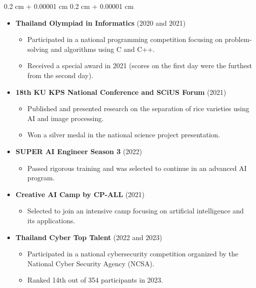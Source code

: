 \documentclass[8pt,letterpaper]{extarticle}
\newenvironment{highlights}{
    \begin{itemize}[
        topsep=0.10 cm,
        parsep=0.10 cm,
        partopsep=0pt,
        itemsep=0pt,
        leftmargin=0.4 cm + 10pt
    ]
}{
    \end{itemize}
} %
\newenvironment{onecolentry}{
    \begin{adjustwidth}{
        0.2 cm + 0.00001 cm
    }{
        0.2 cm + 0.00001 cm
    }
}{
    \end{adjustwidth}
} %
\begin{document}
        \begin{onecolentry}
            \begin{highlights}
                \item \textbf{Thailand Olympiad in Informatics} (2020 and 2021)
                    \begin{highlights}
                        \item Participated in a national programming competition focusing on problem-solving and algorithms using C and C++.
                        \item Received a special award in 2021 (scores on the first day were the furthest from the second day).
                    \end{highlights}
                \item \textbf{18th KU KPS National Conference and SCiUS Forum} (2021)
                    \begin{highlights}
                        \item Published and presented research on the separation of rice varieties using AI and image processing.
                        \item Won a silver medal in the national science project presentation.
                    \end{highlights}
                \item \textbf{SUPER AI Engineer Season 3} (2022)
                    \begin{highlights}
                        \item Passed rigorous training and was selected to continue in an advanced AI program.
                    \end{highlights}
                \item \textbf{Creative AI Camp by CP-ALL} (2021)
                    \begin{highlights}
                        \item Selected to join an intensive camp focusing on artificial intelligence and its applications.
                    \end{highlights}
                \item \textbf{Thailand Cyber Top Talent} (2022 and 2023)
                    \begin{highlights}
                        \item Participated in a national cybersecurity competition organized by the National Cyber Security Agency (NCSA).
                        \item Ranked 14th out of 354 participants in 2023.

\end{highlights}
\end{highlights}
\end{onecolentry}
\end{document}
